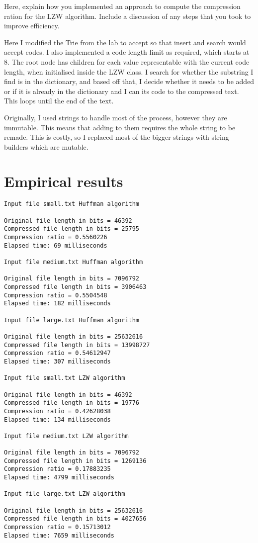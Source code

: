 \documentclass[]{article}
\begin{document}
Here, explain how you implemented an approach to compute the compression ration for the LZW algorithm. Include a discussion of any steps that you took to improve efficiency.

Here I modified the Trie from the lab to accept so that insert and search would accept codes. I also implemented a code length limit as required, which starts at 8. The root node has children for each value representable with the current code length, when initialised inside the LZW class. I search for whether the substring I find is in the dictionary, and based off that, I decide whether it needs to be added or if it is already in the dictionary and I can its code to the compressed text. This loops until the end of the text.  

Originally, I used strings to handle most of the process, however they are immutable. This means that adding to them requires the whole string to be remade. This is costly, so I replaced most of the bigger strings with string builders which are mutable.

\section*{Empirical results}

\begin{verbatim}
Input file small.txt Huffman algorithm

Original file length in bits = 46392
Compressed file length in bits = 25795
Compression ratio = 0.5560226
Elapsed time: 69 milliseconds

Input file medium.txt Huffman algorithm

Original file length in bits = 7096792
Compressed file length in bits = 3906463
Compression ratio = 0.5504548
Elapsed time: 182 milliseconds

Input file large.txt Huffman algorithm

Original file length in bits = 25632616
Compressed file length in bits = 13998727
Compression ratio = 0.54612947
Elapsed time: 307 milliseconds

Input file small.txt LZW algorithm

Original file length in bits = 46392
Compressed file length in bits = 19776
Compression ratio = 0.42628038
Elapsed time: 134 milliseconds

Input file medium.txt LZW algorithm

Original file length in bits = 7096792
Compressed file length in bits = 1269136
Compression ratio = 0.17883235
Elapsed time: 4799 milliseconds

Input file large.txt LZW algorithm

Original file length in bits = 25632616
Compressed file length in bits = 4027656
Compression ratio = 0.15713012
Elapsed time: 7659 milliseconds
\end{verbatim}
\end{document}
